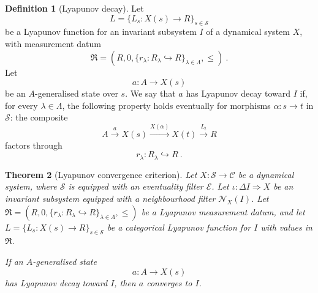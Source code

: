\documentclass[a4paper,reqno,oneside]{amsart}
\newtheorem{theorem}{Theorem}[section]
\theoremstyle{definition}
\newtheorem{definition}[theorem]{Definition}
\theoremstyle{remark}
\numberwithin{equation}{section}
\begin{document}
\begin{definition}[Lyapunov decay]
Let
\begin{equation}
    L=\{L_s\colon X(s)\to R\}_{s\in\mathcal S}
\end{equation}
be a Lyapunov function for an invariant subsystem $I$ of a dynamical
system $X$, with measurement datum
\begin{equation}
    \mathfrak R=
    (R,0,\{r_\lambda\colon R_\lambda\hookrightarrow R\}_{\lambda\in\Lambda},\leq) \ .
\end{equation}
Let
\begin{equation}
    a\colon A\to X(s)
\end{equation}
be an $A$-generalised state over $s$. We say that $a$ has Lyapunov decay
toward $I$ if, for every $\lambda\in\Lambda$, the following property holds
eventually for morphisms $\alpha\colon s\to t$ in $\mathcal S$: the composite
\begin{equation}
    A\xrightarrow{a}X(s)\xrightarrow{X(\alpha)}X(t)
    \xrightarrow{L_t}R
\end{equation}
factors through
\begin{equation}
    r_\lambda\colon R_\lambda\hookrightarrow R \ .
\end{equation}
\end{definition}




\begin{theorem}[Lyapunov convergence criterion]\label{thm: Lyapunov criteria}
Let $X\colon \mathcal S\to\mathcal C$ be a dynamical system, where $\mathcal S$ is equipped with an eventuality
filter $ \mathcal E$. Let $\iota\colon \Delta I\Rightarrow X$ be an invariant subsystem equipped with a neighbourhood filter $\mathcal N_X(I)$.
Let $\mathfrak R=
    (R,0,\{r_\lambda\colon R_\lambda\hookrightarrow R\}_{\lambda\in\Lambda},\leq)$ be a Lyapunov measurement datum, and let $L=\{L_s\colon X(s)\to R\}_{s\in\mathcal S}$ be a categorical Lyapunov function for $I$ with values in $\mathfrak R$.
    
    If an $A$-generalised state
\begin{equation}
    a\colon A\to X(s)
\end{equation}
has Lyapunov decay toward $I$, then $a$ converges to $I$.
\end{theorem}
\end{document}
